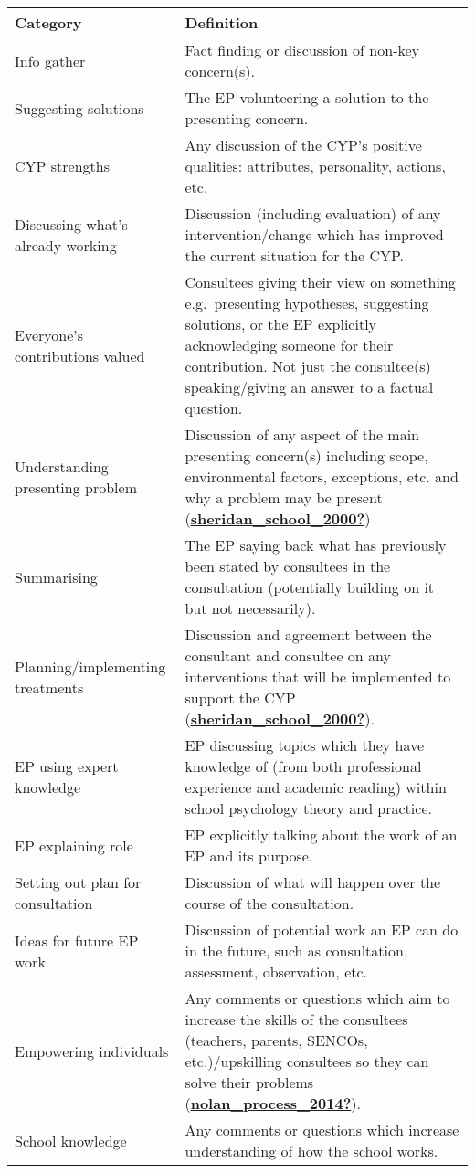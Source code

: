 \documentclass[
]{article}
\begin{document}
\begin{longtable}[]{@{}
  >{\raggedright\arraybackslash}p{}
  >{\raggedright\arraybackslash}p{}@{}}
\toprule
Category & Definition \\
\midrule
\endhead
Info gather & Fact finding or discussion of non-key concern(s). \\
Suggesting solutions & The EP volunteering a solution to the presenting
concern. \\
CYP strengths & Any discussion of the CYP's positive qualities:
attributes, personality, actions, etc. \\
Discussing what's already working & Discussion (including evaluation) of
any intervention/change which has improved the current situation for the
CYP. \\
Everyone's contributions valued & Consultees giving their view on
something e.g.~presenting hypotheses, suggesting solutions, or the EP
explicitly acknowledging someone for their contribution. Not just the
consultee(s) speaking/giving an answer to a factual question. \\
Understanding presenting problem & Discussion of any aspect of the main
presenting concern(s) including scope, environmental factors,
exceptions, etc. and why a problem may be present
(\protect\hyperlink{ref-sheridan_school_2000}{\textbf{sheridan\_school\_2000?}}) \\
Summarising & The EP saying back what has previously been stated by
consultees in the consultation (potentially building on it but not
necessarily). \\
Planning/implementing treatments & Discussion and agreement between the
consultant and consultee on any interventions that will be implemented
to support the CYP
(\protect\hyperlink{ref-sheridan_school_2000}{\textbf{sheridan\_school\_2000?}}). \\
EP using expert knowledge & EP discussing topics which they have
knowledge of (from both professional experience and academic reading)
within school psychology theory and practice. \\
EP explaining role & EP explicitly talking about the work of an EP and
its purpose. \\
Setting out plan for consultation & Discussion of what will happen over
the course of the consultation. \\
Ideas for future EP work & Discussion of potential work an EP can do in
the future, such as consultation, assessment, observation, etc. \\
Empowering individuals & Any comments or questions which aim to increase
the skills of the consultees (teachers, parents, SENCOs,
etc.)/upskilling consultees so they can solve their problems
(\protect\hyperlink{ref-nolan_process_2014}{\textbf{nolan\_process\_2014?}}). \\
School knowledge & Any comments or questions which increase
understanding of how the school works. \\
\bottomrule
\end{longtable}
\end{document}
